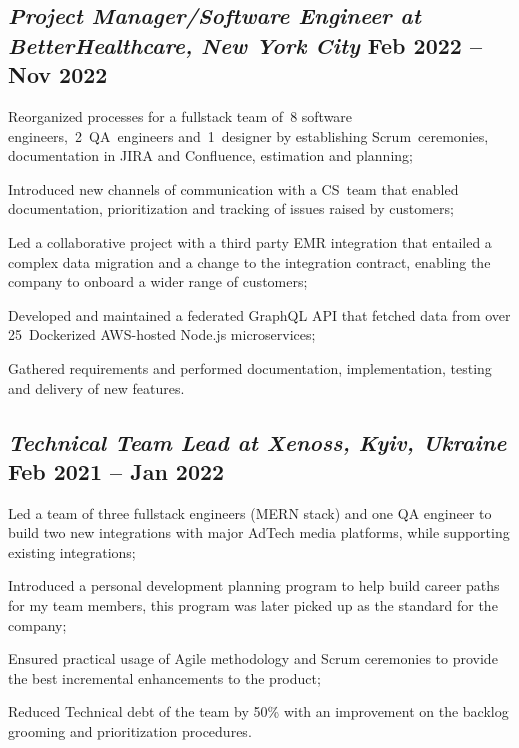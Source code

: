 \documentclass[a4paper,12pt]{book}
\begin{document}
\subsection{{\sl\bf\hspace{0.1in}Project Manager/Software Engineer at BetterHealthcare,  New York City } \hfill Feb 2022 -- Nov 2022}
\begin{zitemize}
\item Reorganized processes for a fullstack team of~8 software engineers,~2~QA~engineers and~1~designer by establishing Scrum~ceremonies, documentation in JIRA and Confluence, estimation and planning;
\item Introduced new channels of communication with a CS~team that enabled documentation, prioritization and tracking of issues raised by customers;
\item Led a collaborative project with a third party EMR integration that entailed a complex data migration and a change to the integration contract, enabling the company to onboard a wider range of customers;
\item Developed and maintained a federated GraphQL API that fetched data from over 25~Dockerized AWS-hosted Node.js microservices;
\item Gathered requirements and performed documentation, implementation, testing and delivery of new features.
\end{zitemize}

\subsection{{\sl\bf\hspace{0.1in}Technical Team Lead at Xenoss, Kyiv, Ukraine } \hfill Feb 2021 -- Jan 2022}
\begin{zitemize}
 \item Led a team of three fullstack engineers (MERN stack) and one QA engineer to build two new integrations with major AdTech media platforms, while supporting existing integrations;
 \item Introduced a personal development planning program to help build career paths for my team members, this program was later picked up as the standard for the company;
 \item Ensured practical usage of Agile methodology and Scrum ceremonies to provide the best incremental enhancements to the product;
 \item Reduced Technical debt of the team by 50\% with an improvement on the backlog grooming and prioritization procedures.
\end{zitemize}
\end{document}
